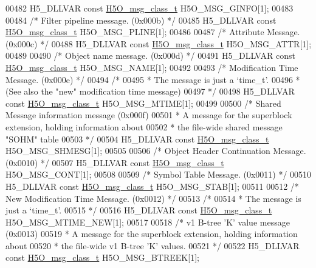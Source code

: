 \begin{DoxyCode}
00482 H5\_DLLVAR \textcolor{keyword}{const} \hyperlink{struct_h5_o__msg__class__t}{H5O\_msg\_class\_t} H5O\_MSG\_GINFO[1];
00483 
00484 \textcolor{comment}{/* Filter pipeline message. (0x000b) */}
00485 H5\_DLLVAR \textcolor{keyword}{const} \hyperlink{struct_h5_o__msg__class__t}{H5O\_msg\_class\_t} H5O\_MSG\_PLINE[1];
00486 
00487 \textcolor{comment}{/* Attribute Message. (0x000c) */}
00488 H5\_DLLVAR \textcolor{keyword}{const} \hyperlink{struct_h5_o__msg__class__t}{H5O\_msg\_class\_t} H5O\_MSG\_ATTR[1];
00489 
00490 \textcolor{comment}{/* Object name message. (0x000d) */}
00491 H5\_DLLVAR \textcolor{keyword}{const} \hyperlink{struct_h5_o__msg__class__t}{H5O\_msg\_class\_t} H5O\_MSG\_NAME[1];
00492 
00493 \textcolor{comment}{/* Modification Time Message. (0x000e) */}
00494 \textcolor{comment}{/*}
00495 \textcolor{comment}{ * The message is just a `time\_t'.}
00496 \textcolor{comment}{ * (See also the "new" modification time message)}
00497 \textcolor{comment}{ */}
00498 H5\_DLLVAR \textcolor{keyword}{const} \hyperlink{struct_h5_o__msg__class__t}{H5O\_msg\_class\_t} H5O\_MSG\_MTIME[1];
00499 
00500 \textcolor{comment}{/* Shared Message information message (0x000f)}
00501 \textcolor{comment}{ * A message for the superblock extension, holding information about}
00502 \textcolor{comment}{ * the file-wide shared message "SOHM" table}
00503 \textcolor{comment}{ */}
00504 H5\_DLLVAR \textcolor{keyword}{const} \hyperlink{struct_h5_o__msg__class__t}{H5O\_msg\_class\_t} H5O\_MSG\_SHMESG[1];
00505 
00506 \textcolor{comment}{/* Object Header Continuation Message. (0x0010) */}
00507 H5\_DLLVAR \textcolor{keyword}{const} \hyperlink{struct_h5_o__msg__class__t}{H5O\_msg\_class\_t} H5O\_MSG\_CONT[1];
00508 
00509 \textcolor{comment}{/* Symbol Table Message. (0x0011) */}
00510 H5\_DLLVAR \textcolor{keyword}{const} \hyperlink{struct_h5_o__msg__class__t}{H5O\_msg\_class\_t} H5O\_MSG\_STAB[1];
00511 
00512 \textcolor{comment}{/* New Modification Time Message. (0x0012) */}
00513 \textcolor{comment}{/*}
00514 \textcolor{comment}{ * The message is just a `time\_t'.}
00515 \textcolor{comment}{ */}
00516 H5\_DLLVAR \textcolor{keyword}{const} \hyperlink{struct_h5_o__msg__class__t}{H5O\_msg\_class\_t} H5O\_MSG\_MTIME\_NEW[1];
00517 
00518 \textcolor{comment}{/* v1 B-tree 'K' value message (0x0013)}
00519 \textcolor{comment}{ * A message for the superblock extension, holding information about}
00520 \textcolor{comment}{ * the file-wide v1 B-tree 'K' values.}
00521 \textcolor{comment}{ */}
00522 H5\_DLLVAR \textcolor{keyword}{const} \hyperlink{struct_h5_o__msg__class__t}{H5O\_msg\_class\_t} H5O\_MSG\_BTREEK[1];

\end{DoxyCode}
